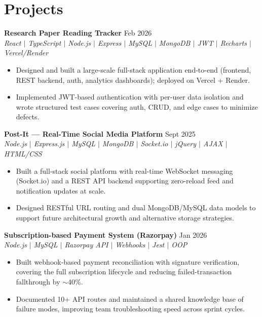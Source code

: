 \documentclass[10pt,letterpaper]{article}
\begin{document}
\section{Projects}
\vspace{2pt}

\textbf{Research Paper Reading Tracker} \hfill Feb 2026 \\[-3pt]
{\small\textit{React $|$ TypeScript $|$ Node.js $|$ Express $|$ MySQL $|$ MongoDB $|$ JWT $|$ Recharts $|$ Vercel/Render}} \\[-10pt]
\begin{itemize}
  \item Designed and built a large-scale full-stack application end-to-end (frontend, REST backend, auth, analytics dashboards); deployed on Vercel + Render.
  \item Implemented JWT-based authentication with per-user data isolation and wrote structured test cases covering auth, CRUD, and edge cases to minimize defects.
\end{itemize}

\vspace{2pt}
\textbf{Post-It --- Real-Time Social Media Platform} \hfill Sept 2025 \\[-3pt]
{\small\textit{Node.js $|$ Express.js $|$ MySQL $|$ MongoDB $|$ Socket.io $|$ jQuery $|$ AJAX $|$ HTML/CSS}} \\[-10pt]
\begin{itemize}
  \item Built a full-stack social platform with real-time WebSocket messaging (Socket.io) and a REST API backend supporting zero-reload feed and notification updates at scale.
  \item Designed RESTful URL routing and dual MongoDB/MySQL data models to support future architectural growth and alternative storage strategies.
\end{itemize}

\vspace{2pt}
\textbf{Subscription-based Payment System (Razorpay)} \hfill Jan 2026 \\[-3pt]
{\small\textit{Node.js $|$ MySQL $|$ Razorpay API $|$ Webhooks $|$ Jest $|$ OOP}} \\[-10pt]
\begin{itemize}
  \item Built webhook-based payment reconciliation with signature verification, covering the full subscription lifecycle and reducing failed-transaction fallthrough by $\sim$40\%.
  \item Documented 10+ API routes and maintained a shared knowledge base of failure modes, improving team troubleshooting speed across sprint cycles.
\end{itemize}
\end{document}
